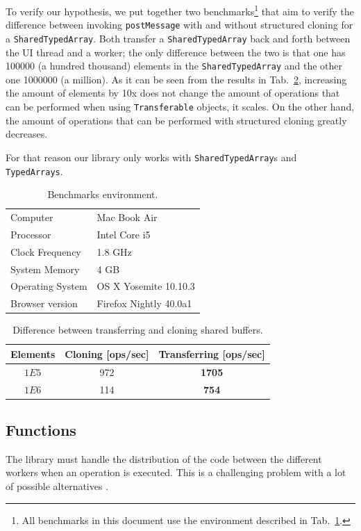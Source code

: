 \documentclass[runningheads,a4paper]{llncs}
\begin{document}
To verify our hypothesis, we put together two benchmarks\footnote{All benchmarks in this document use the environment described in Tab.~\ref{tab:env}.} that aim to verify the difference between invoking \verb+postMessage+ with and without structured cloning for a \verb+SharedTypedArray+. Both transfer a \verb+SharedTypedArray+ back and forth between the UI thread and a worker; the only difference between the two is that one has 100000 (a hundred thousand) elements in the \verb+SharedTypedArray+ and the other one 1000000 (a million). As it can be seen from the  results in Tab.~\ref{tab:transf-vs-clone}, increasing the amount of elements by 10x does not change the amount of operations that can be performed when using \verb+Transferable+ objects, it scales. On the other hand, the amount of operations that can be performed with structured cloning greatly decreases.

For that reason our library only works with \verb+SharedTypedArray+s and \verb+TypedArrays+.

\begin{table}
  \centering
  \begin{tabular}{|l|l|}
    \hline
    Computer & Mac Book Air \\
    Processor & Intel Core i5 \\
    Clock Frequency & 1.8 GHz \\
    System Memory & 4 GB \\
    Operating System & OS X Yosemite 10.10.3 \\
    Browser version & Firefox Nightly 40.0a1 \\
    \hline
  \end{tabular}
  \caption{Benchmarks environment.}
  \label{tab:env}
\end{table}

\begin{table}
  \centering
  \begin{tabular}{|c|c|c|}
    \hline
    Elements & Cloning [ops/sec] & Transferring [ops/sec] \\
    \hline
    \(1E5\) & 972 & \textbf{1705} \\
    \(1E6\) & 114 & \textbf{754} \\
    \hline
  \end{tabular}
  \caption{Difference between transferring and cloning shared buffers.}
  \label{tab:transf-vs-clone}
\end{table}

\subsection{Functions}\label{sub-sec:functions}
The library must handle the distribution of the code between the different workers when an operation is executed. This is a challenging problem with a lot of possible alternatives \cite{cloud-haskell} \cite{distributed-scheme}.
\end{document}
